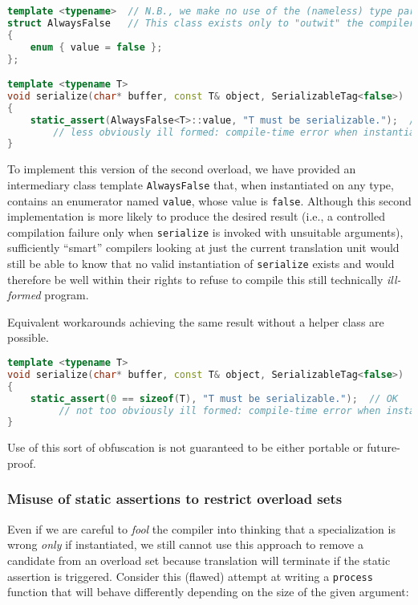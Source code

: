 \begin{lstlisting}[language=C++]
template <typename>  // N.B., we make no use of the (nameless) type parameter:
struct AlwaysFalse   // This class exists only to "outwit" the compiler.
{
    enum { value = false };
};

template <typename T>
void serialize(char* buffer, const T& object, SerializableTag<false>)  // (2b)
{
    static_assert(AlwaysFalse<T>::value, "T must be serializable.");  // OK
        // less obviously ill formed: compile-time error when instantiated
}
\end{lstlisting}
    
\noindent To implement this version of the second overload, we have provided an
intermediary class template \lstinline!AlwaysFalse! that, when instantiated
on any type, contains an enumerator named \lstinline!value!, whose value is
\lstinline!false!. Although this second implementation is more likely to
produce the desired result (i.e., a controlled compilation failure
only when \lstinline!serialize! is invoked with unsuitable arguments),
sufficiently ``smart'' compilers looking at just the current translation
unit would still be able to know that no valid instantiation of
\lstinline!serialize! exists and would therefore be well within their
rights to refuse to compile this still technically \emph{ill-formed}
program. 

Equivalent workarounds achieving the same result without a
helper class are possible.

\begin{lstlisting}[language=C++]
template <typename T>
void serialize(char* buffer, const T& object, SerializableTag<false>)  // (2c)
{
    static_assert(0 == sizeof(T), "T must be serializable.");  // OK
         // not too obviously ill formed: compile-time error when instantiated
}
\end{lstlisting}
    
\noindent Use of this sort of obfuscation is not guaranteed to be either
portable or future-proof.

\subsubsection[Misuse of static assertions to restrict overload sets]{Misuse of static assertions to restrict overload sets}\label{misuse-of-static-assertions-to-restrict-overload-sets}

Even if we are careful to \emph{fool} the compiler into thinking that a
specialization is wrong \emph{only} if instantiated, we still cannot use
this approach to remove a candidate from an overload set because translation
will terminate if the static assertion is triggered. Consider this
(flawed) attempt at writing a \lstinline!process! function that will behave
differently depending on the size of the given argument:

